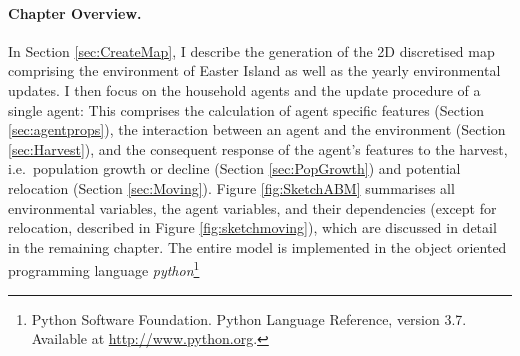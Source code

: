 
\paragraph{Chapter Overview.}
In Section \ref{sec:CreateMap}, I describe the generation of the 2D discretised map comprising the environment of Easter Island as well as the yearly environmental updates. I then focus on the household agents and the update procedure of a single agent:
This comprises the calculation of agent specific features (Section \ref{sec:agentprops}), the interaction between an agent and the environment (Section \ref{sec:Harvest}), and the consequent response of the agent's features to the harvest, i.e.\ population growth or decline (Section \ref{sec:PopGrowth}) and potential relocation (Section \ref{sec:Moving}).
Figure \ref{fig:SketchABM} summarises all environmental variables, the agent variables, and their dependencies (except for relocation, described in Figure \ref{fig:sketchmoving}), which are discussed in detail in the remaining chapter.
The entire model is implemented in the object oriented programming language \textit{python}\footnote{Python Software Foundation. Python Language Reference, version 3.7. Available at \url{http://www.python.org}.}

